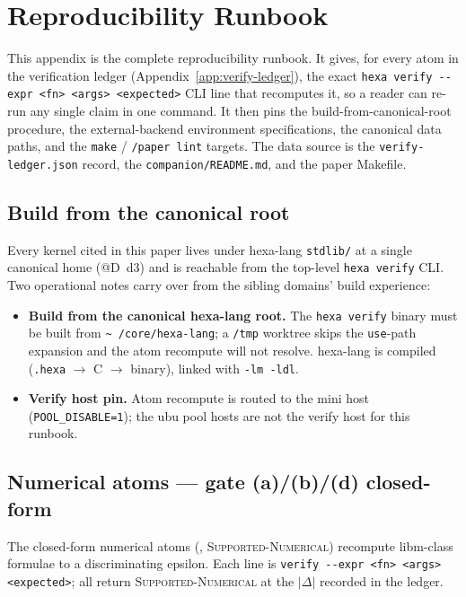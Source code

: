 \section{Reproducibility Runbook}
\label{app:repro}

This appendix is the complete reproducibility runbook. It gives, for
every atom in the verification ledger
(Appendix~\ref{app:verify-ledger}), the exact \texttt{hexa verify
{-}{-}expr <fn> <args> <expected>} CLI line that recomputes it, so a
reader can re-run any single claim in one command. It then pins the
build-from-canonical-root procedure, the external-backend environment
specifications, the canonical data paths, and the \texttt{make} /
\texttt{/paper lint} targets. The data source is the
\texttt{verify-ledger.json} record, the \texttt{companion/README.md},
and the paper Makefile.

\subsection{Build from the canonical root}
\label{app:repro:build}

Every kernel cited in this paper lives under hexa-lang \texttt{stdlib/}
at a single canonical home (@D~d3) and is reachable from the top-level
\texttt{hexa verify} CLI. Two operational notes carry over from the
sibling domains' build experience:
\begin{itemize}\itemsep0.2em
\item \textbf{Build from the canonical hexa-lang root.} The
\texttt{hexa verify} binary must be built from \texttt{\textasciitilde
/core/hexa-lang}; a \texttt{/tmp} worktree skips the \texttt{use}-path
expansion and the atom recompute will not resolve. hexa-lang is
compiled (\texttt{.hexa} $\rightarrow$ C $\rightarrow$ binary), linked
with \texttt{-lm -ldl}.
\item \textbf{Verify host pin.} Atom recompute is routed to the mini
host (\texttt{POOL\_DISABLE=1}); the ubu pool hosts are not the verify
host for this runbook.
\end{itemize}

\subsection{Numerical atoms --- gate (a)/(b)/(d) closed-form}
\label{app:repro:numerical}

The closed-form numerical atoms (\tierGreen, \textsc{Supported-Numerical})
recompute libm-class formulae to a discriminating epsilon. Each line is
\texttt{verify {-}{-}expr <fn> <args> <expected>}; all return
\textsc{Supported-Numerical} at the $|\Delta|$ recorded in the ledger.

